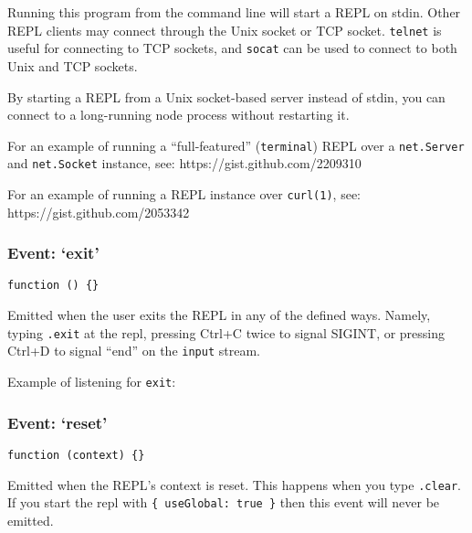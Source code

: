 Running this program from the command line will start a REPL on stdin.
Other REPL clients may connect through the Unix socket or TCP socket.
\texttt{telnet} is useful for connecting to TCP sockets, and
\texttt{socat} can be used to connect to both Unix and TCP sockets.

By starting a REPL from a Unix socket-based server instead of stdin, you
can connect to a long-running node process without restarting it.

For an example of running a ``full-featured'' (\texttt{terminal}) REPL
over a \texttt{net.Server} and \texttt{net.Socket} instance, see:
https://gist.github.com/2209310

For an example of running a REPL instance over \texttt{curl(1)}, see:
https://gist.github.com/2053342

\subsubsection{Event: `exit'}

\texttt{function () \{\}}

Emitted when the user exits the REPL in any of the defined ways. Namely,
typing \texttt{.exit} at the repl, pressing Ctrl+C twice to signal
SIGINT, or pressing Ctrl+D to signal ``end'' on the \texttt{input}
stream.

Example of listening for \texttt{exit}:

\begin{Shaded}
\begin{Highlighting}[]
\NormalTok{(}\NormalTok{, } \NormalTok{() \{}
  \NormalTok{(}\NormalTok{);}
  \NormalTok{();}
\NormalTok{\});}
\end{Highlighting}
\end{Shaded}

\subsubsection{Event: `reset'}

\texttt{function (context) \{\}}

Emitted when the REPL's context is reset. This happens when you type
\texttt{.clear}. If you start the repl with
\texttt{\{ useGlobal: true \}} then this event will never be emitted.

